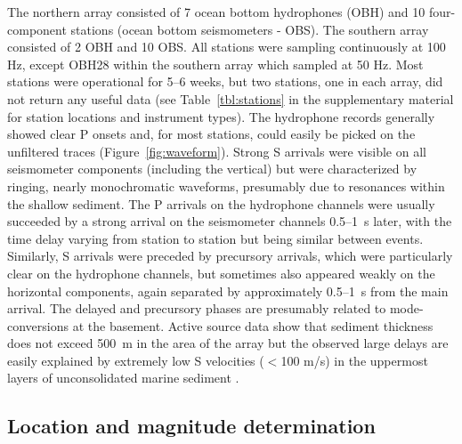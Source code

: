 \documentclass[reviewcopy]{elsarticle}
\begin{document}
The northern array consisted of 7 ocean bottom hydrophones (OBH) and 10 four-component stations (ocean
bottom seismometers - OBS).
   The southern array consisted of 2 OBH and 10 OBS.  All stations
   were sampling continuously at 100 Hz, except OBH28 within the
   southern array which sampled at 50 Hz. Most stations were operational for 5--6 weeks, but two
   stations, one in each array, did not return any useful data (see
   Table~\ref{tbl:stations} in the supplementary material for station locations and
   instrument types).
   The hydrophone records generally showed clear
   P onsets and, for most stations, could easily be picked on
   the unfiltered traces (Figure~\ref{fig:waveform}).
  Strong S arrivals were visible on all
   seismometer components (including the vertical) but were
   characterized by ringing, nearly monochromatic waveforms, presumably due to resonances within the shallow
   sediment. The P arrivals on the hydrophone channels were usually
   succeeded by a strong arrival on the seismometer channels 0.5--1~s
   later, with the time delay varying from station to station but
   being similar between events.  Similarly, S arrivals were preceded
   by precursory arrivals, which were particularly clear on the hydrophone
   channels, but sometimes also appeared weakly on the horizontal components, again
   separated by approximately 0.5--1~s from the main arrival.  The
   delayed and precursory phases are presumably related to
   mode-conversions at the basement. Active source data show that sediment
   thickness does not exceed 500~m in the area of the array
   \citep{ifmgeomar02} but the observed large delays are easily
   explained by extremely low S velocities ($<$100 m/s) in the
   uppermost layers of unconsolidated marine sediment \citep{hamilton80}.

\subsection{Location and magnitude determination}
\end{document}
